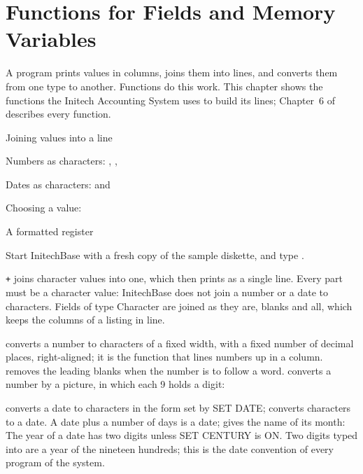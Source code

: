 \chapter{Functions for Fields and Memory Variables}
A program prints values in columns, joins them into lines, and converts them
from one type to another.  Functions do this work.  This chapter shows the
functions the Initech Accounting System uses to build its lines; Chapter~6 of
 describes every function.

\begin{ChapterCovers}
\item Joining values into a line
\item Numbers as characters: , , 
\item Dates as characters:  and 
\item Choosing a value: 
\item A formatted register
\end{ChapterCovers}

Start InitechBase with a fresh copy of the sample diskette, and type
.

\texttt{+} joins character values into one, which  then prints as a single
line.  Every part must be a character value: InitechBase does not join a number
or a date to characters.  Fields of type Character are joined as they are,
blanks and all, which keeps the columns of a listing in line.

 converts a number to characters of a fixed width, with a fixed number
of decimal places, right-aligned; it is the function that lines numbers up in
a column.   removes the leading blanks when the number is to follow
a word.   converts a number by a picture, in which each 9 holds a
digit:

 converts a date to characters in the form set by SET DATE;
 converts characters to a date.  A date plus a number of days is a
date;  gives the name of its month:
The year of a date has two digits unless SET CENTURY is ON.  Two digits typed
into  are a year of the nineteen hundreds; this is the date
convention of every program of the system.

